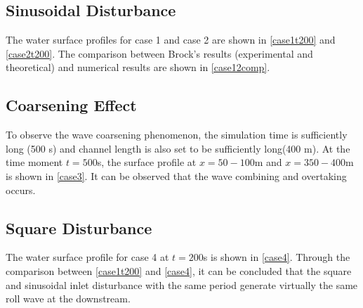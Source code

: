 \documentclass[a4paper]{article}
\begin{document}
\subsection{Sinusoidal Disturbance}
The water surface profiles for case 1 and case 2 are shown in \autoref{case1t200} and \autoref{case2t200}. The comparison between Brock's results (experimental and theoretical) and numerical results are shown in \autoref{case12comp}.

\subsection{Coarsening Effect}
To observe the wave coarsening phenomenon, the simulation time is sufficiently long (500 s) and channel length is also set to be sufficiently long(400 m). At the time moment $t=500$s, the surface profile at $x=50-100$m and $x=350-400$m  is shown in \autoref{case3}. It can be observed that the wave combining and overtaking occurs.

\subsection{Square Disturbance}
The water surface profile for case 4 at $t=200$s is shown in \autoref{case4}. Through the comparison between \autoref{case1t200} and \autoref{case4}, it can be concluded that the square and sinusoidal inlet disturbance with the same period generate virtually the same roll wave at the downstream.


\end{document}
